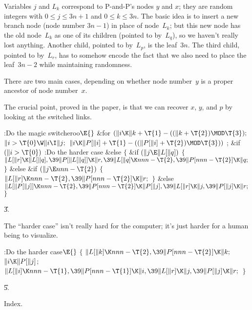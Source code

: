Variables $j$ and $L_k$ correspond to P-and-P's nodes $y$ and $x$;
they are random integers with $0\le j\le 3n+1$ and $0\le k\le3n$.
The basic idea is to insert a new branch node (node number $3n-1$)
in place of node~$L_k$; but this new node has the old node~$L_k$ as
one of its children (pointed to by~$L_q$), so we haven't really
lost anything. Another child,
pointed to by~$L_p$, is the leaf~$3n$. The third child, pointed
to by~$L_r$, has to somehow encode the fact that we also need
to place the leaf~$3n-2$ while maintaining randomness.

There are two main cases, depending on whether node number~$y$ is
a proper ancestor of node number~$x$.

The crucial point, proved in the paper, is that we can recover
$x$, $y$, and $p$ by looking at the switched links.

\fi

\B{}:Do the magic switcheroo\X${}\E{}$\6
\&{for} ${}(\|i\K\|k+\T{1}-((\|k+\T{2})\MOD\T{3});{}$ ${}\|i>\T{0}\W\|i\I%
\|j;{}$ ${}\|i\K\|P[\|i]+\T{1}-((\|P[\|i]+\T{2})\MOD\T{3})){}$\1\5
;\2\6
\&{if} ${}(\|i>\T{0}){}$\1\5
:Do the harder case\X\2\6
\&{else}\5
${}\{{}$\1\6
\&{if} ${}(\|j\E\|L[\|q]){}$\5
${}\{{}$\1\6
${}\|L[\|r]\K\|L[\|q],\39\|P[\|L[\|q]]\K\|r,\39\|L[\|q]\K\\{nnn}-\T{2},\39\|P[%
\\{nnn}-\T{2}]\K\|q;{}$\6
\4${}\}{}$\5
\2\&{else} \&{if} ${}(\|j\E\\{nnn}-\T{2}){}$\5
${}\{{}$\1\6
${}\|L[\|r]\K\\{nnn}-\T{2},\39\|P[\\{nnn}-\T{2}]\K\|r;{}$\6
\4${}\}{}$\5
\2\&{else}\1\5
${}\|L[\|P[\|j]]\K\\{nnn}-\T{2},\39\|P[\\{nnn}-\T{2}]\K\|P[\|j],\39\|L[\|r]\K%
\|j,\39\|P[\|j]\K\|r;{}$\2\6
\4${}\}{}$\2\par
\U3.\fi

The ``harder case'' isn't really hard for the computer;
it's just harder for a human being to visualize.

\Y\B\4:Do the harder case\X${}\E{}$\6
${}\{{}$\1\6
${}\|L[\|k]\K\\{nnn}-\T{2},\39\|P[\\{nnn}-\T{2}]\K\|k;{}$\6
${}\|i\K\|P[\|j]{}$;\6
${}\|L[\|i]\K\\{nnn}-\T{1},\39\|P[\\{nnn}-\T{1}]\K\|i,\39\|L[\|r]\K\|j,\39\|P[%
\|j]\K\|r;{}$\6
\4${}\}{}$\2\par
\U5.\fi

Index.
\fi

\inx
\fin
\con
